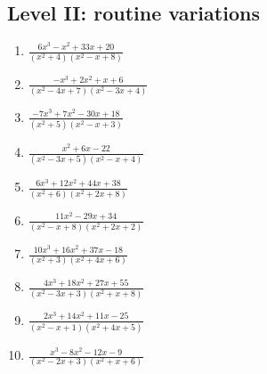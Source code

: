 \documentclass[11pt,oneside]{book}
\begin{document}
\subsection*{Level II: routine variations}
\begin{enumerate}[leftmargin=*,label=\textbf{\arabic*.},itemsep=0.65\baselineskip]
\item $\displaystyle \frac{6 x^{3} - x^{2} + 33 x + 20}{\left(x^{2} + 4\right) \left(x^{2} - x + 8\right)}$
\item $\displaystyle \frac{- x^{3} + 2 x^{2} + x + 6}{\left(x^{2} - 4 x + 7\right) \left(x^{2} - 3 x + 4\right)}$
\item $\displaystyle \frac{- 7 x^{3} + 7 x^{2} - 30 x + 18}{\left(x^{2} + 5\right) \left(x^{2} - x + 3\right)}$
\item $\displaystyle \frac{x^{2} + 6 x - 22}{\left(x^{2} - 3 x + 5\right) \left(x^{2} - x + 4\right)}$
\item $\displaystyle \frac{6 x^{3} + 12 x^{2} + 44 x + 38}{\left(x^{2} + 6\right) \left(x^{2} + 2 x + 8\right)}$
\item $\displaystyle \frac{11 x^{2} - 29 x + 34}{\left(x^{2} - x + 8\right) \left(x^{2} + 2 x + 2\right)}$
\item $\displaystyle \frac{10 x^{3} + 16 x^{2} + 37 x - 18}{\left(x^{2} + 3\right) \left(x^{2} + 4 x + 6\right)}$
\item $\displaystyle \frac{4 x^{3} + 18 x^{2} + 27 x + 55}{\left(x^{2} - 3 x + 3\right) \left(x^{2} + x + 8\right)}$
\item $\displaystyle \frac{2 x^{3} + 14 x^{2} + 11 x - 25}{\left(x^{2} - x + 1\right) \left(x^{2} + 4 x + 5\right)}$
\item $\displaystyle \frac{x^{3} - 8 x^{2} - 12 x - 9}{\left(x^{2} - 2 x + 3\right) \left(x^{2} + x + 6\right)}$
\end{enumerate}
\end{document}
